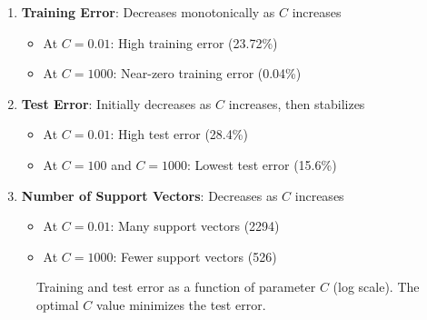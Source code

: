 \documentclass{article}
\begin{document}
\begin{enumerate}
    \item \textbf{Training Error}: Decreases monotonically as $C$ increases
    \begin{itemize}
        \item At $C = 0.01$: High training error (23.72\%)
        \item At $C = 1000$: Near-zero training error (0.04\%)
    \end{itemize}
    
    \item \textbf{Test Error}: Initially decreases as $C$ increases, then stabilizes
    \begin{itemize}
        \item At $C = 0.01$: High test error (28.4\%)
        \item At $C = 100$ and $C = 1000$: Lowest test error (15.6\%)
    \end{itemize}
    
    \item \textbf{Number of Support Vectors}: Decreases as $C$ increases
    \begin{itemize}
        \item At $C = 0.01$: Many support vectors (2294)
        \item At $C = 1000$: Fewer support vectors (526)
    \end{itemize}
\end{enumerate}

\begin{figure}[h]
\centering
{}
\caption{Training and test error as a function of parameter $C$ (log scale). The optimal $C$ value minimizes the test error.}
\end{figure}
\end{document}
